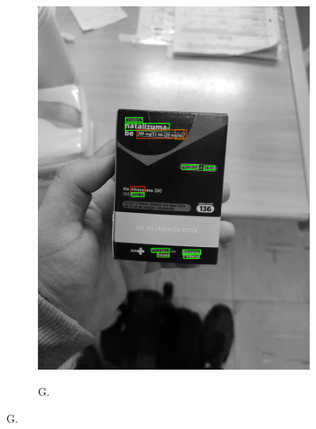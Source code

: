 \begin{figure}[htb]
\begin{subfigure}[t]{0.21\textwidth}
        \includegraphics[width=\linewidth]{../pictures/tysabri_rgb_r_only_boxes.jpg}
    \end{subfigure}
    \hfill
    \begin{subfigure}[t]{0.21\textwidth}
        \centering
        \caption{G.}
        \label{fig:foto:versoes:1:G:boxes}

\end{subfigure}
\end{figure}
